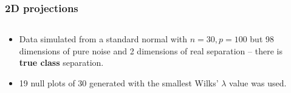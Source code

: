 \documentclass{beamer}
\begin{document}
\begin{frame}
  \frametitle{ 2D projections}
	\begin{columns}
		\begin{column}{0.4\textwidth}
		  \begin{itemize}
			  \item Data simulated from a standard normal with $n=30, p=100$ but 98 dimensions of pure noise and 2 dimensions of real separation -- there is  {\bf true class} separation.
			\item 19 null plots of 30 generated with the smallest Wilks' $\lambda$ value was used. 
		  \end{itemize}		
			
		\end{column}
		
		\begin{column}{0.6\textwidth}
			 \begin{center}  \end{center}
		\end{column}
	\end{columns}  
\end{frame} 
\end{document}
